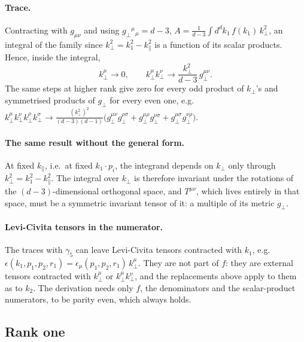 \documentclass[11pt,a4paper]{article}
\newcommand{\kpar}{k_{\parallel}}
\newcommand{\kperp}{k_{\perp}}
\begin{document}
\paragraph{Trace.} Contracting with $g_{\mu\nu}$ and using $g_\perp{}^\mu{}_\mu=d-3$,
$A=\frac{1}{d-3}\int d^dk_1\,f(k_1)\,\kperp^2$, an integral of the family since $\kperp^2=k_1^2-\kpar^2$ is a
function of its scalar products. Hence, inside the integral,
\begin{equation}
\kperp^\mu\to0,\qquad
\kperp^\mu\kperp^\nu\to\frac{\kperp^2}{d-3}\,g_\perp^{\mu\nu}.
\end{equation}
The same steps at higher rank give zero for every odd product of $\kperp$'s and symmetrised products of $g_\perp$ for
every even one, e.g.\ $\kperp^\mu\kperp^\nu\kperp^\rho\kperp^\sigma\to\frac{(\kperp^2)^2}{(d-3)(d-1)}
\big(g_\perp^{\mu\nu}g_\perp^{\rho\sigma}+g_\perp^{\mu\rho}g_\perp^{\nu\sigma}+g_\perp^{\mu\sigma}g_\perp^{\nu\rho}\big)$.

\paragraph{The same result without the general form.} At fixed $\kpar$, i.e.\ at fixed $k_1\cdot p_i$, the integrand
depends on $\kperp$ only through $\kperp^2=k_1^2-\kpar^2$. The integral over $\kperp$ is therefore invariant under the
rotations of the $(d-3)$-dimensional orthogonal space, and $T^{\mu\nu}$, which lives entirely in that space, must be a
symmetric invariant tensor of it: a multiple of its metric $g_\perp$.

\paragraph{Levi-Civita tensors in the numerator.} The traces with $\gamma_5$ can leave Levi-Civita tensors contracted
with $k_1$, e.g.\ $\epsilon(k_1,p_1,p_2,r_1)=\epsilon_\mu(p_1,p_2,r_1)\,\kperp^\mu$. They are not part of $f$: they are
external tensors contracted with $\kperp^\mu$ or $\kperp^\mu\kperp^\nu$, and the replacements above apply to them as
to $k_2$. The derivation needs only $f$, the denominators and the scalar-product numerators, to be parity even, which
always holds.

\subsection{Rank one}
\end{document}
